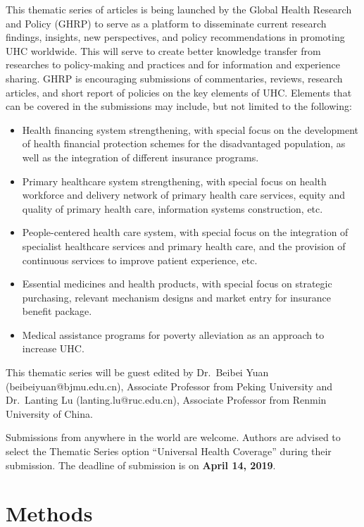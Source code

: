 \documentclass[]{elsarticle} %
\begin{document}
This thematic series of articles is being launched by the Global Health Research and Policy (GHRP) to serve as a platform to disseminate current research findings, insights, new perspectives, and policy recommendations in promoting UHC worldwide. This will serve to create better knowledge transfer from researches to policy-making and practices and for information and experience sharing. GHRP is encouraging submissions of commentaries, reviews, research articles, and short report of policies on the key elements of UHC. Elements that can be covered in the submissions may include, but not limited to the following:

\begin{itemize}
\item
  Health financing system strengthening, with special focus on the development of health financial protection schemes for the disadvantaged population, as well as the integration of different insurance programs.
\item
  Primary healthcare system strengthening, with special focus on health workforce and delivery network of primary health care services, equity and quality of primary health care, information systems construction, etc.
\item
  People-centered health care system, with special focus on the integration of specialist healthcare services and primary health care, and the provision of continuous services to improve patient experience, etc.
\item
  Essential medicines and health products, with special focus on strategic purchasing, relevant mechanism designs and market entry for insurance benefit package.
\item
  Medical assistance programs for poverty alleviation as an approach to increase UHC.
\end{itemize}

This thematic series will be guest edited by Dr.~Beibei Yuan (beibeiyuan@bjmu.edu.cn), Associate Professor from Peking University and Dr.~Lanting Lu (lanting.lu@ruc.edu.cn), Associate Professor from Renmin University of China.

Submissions from anywhere in the world are welcome. Authors are advised to select the Thematic Series option ``Universal Health Coverage'' during their submission. The deadline of submission is on \textbf{April 14, 2019}.

\hypertarget{methods}{%
\section{Methods}\label{methods}}
\end{document}
